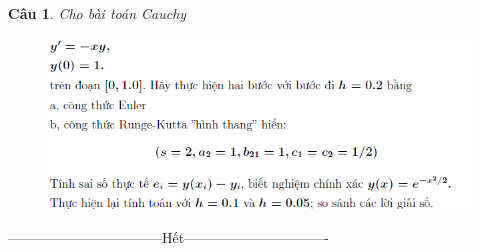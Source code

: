\documentclass[11pt]{article}
\newtheorem{bt}{Câu}
\begin{document}
\newpage

\begin{bt}
Cho bài toán Cauchy
\end{bt}

\begin{figure}[h!]
	\centering
	\includegraphics[scale = 0.9]{6}
\end{figure}


\centerline{———————————Hết——————————-}
\end{document}
